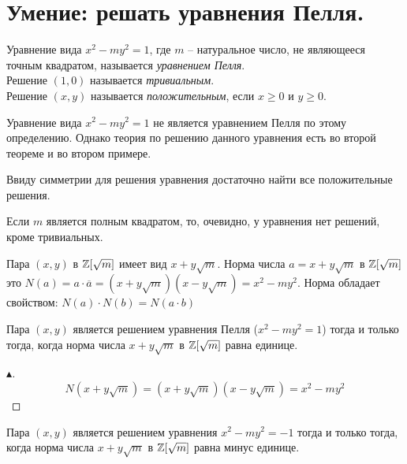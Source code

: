 \setcounter{section}{69}
\section{Умение: решать уравнения Пелля.}

\begin{definition}
    Уравнение вида $x^2 -my^2 = 1$, где $m$ -- натуральное число, не являющееся точным квадратом, называется \textit{уравнением Пелля}. \\
    Решение $(1, 0)$ называется \textit{тривиальным}. \\
    Решение $(x, y)$ называется \textit{положительным}, если $x \geq 0$ и $y \geq 0$.
\end{definition}

\begin{note}
    Уравнение вида $x^2 - my^2 = 1$ не является уравнением Пелля по этому определению. Однако теория по решению данного уравнения есть во второй теореме и во втором примере. 
\end{note}

\begin{note}
    Ввиду симметрии для решения уравнения достаточно найти все положительные решения.
\end{note}

\begin{note}
    Если $m$ является полным квадратом, то, очевидно, у уравнения нет решений, кроме тривиальных.
\end{note}

\begin{note}
    Пара $(x, y)$ в $\mathbb{Z}[\sqrt{m}]$ имеет вид $x + y\sqrt{m}$. Норма числа $a = x + y\sqrt{m}$ в $\mathbb{Z}[\sqrt{m}]$ это $N(a) = a \cdot \overline{a} = (x + y\sqrt{m})(x - y\sqrt{m}) = x^2 - my^2$. Норма обладает свойством: $N(a) \cdot N(b) = N(a\cdot b)$
\end{note}

\begin{proposition}
    Пара $(x, y)$ является решением уравнения Пелля ($x^2 - my^2 = 1$) тогда и только тогда, когда норма числа $x + y\sqrt{m}$ в $\mathbb{Z}[\sqrt{m}]$ равна единице.
    \begin{proof}[$\blacktriangle$]
        $$
            N(x + y\sqrt{m}) = (x + y\sqrt{m})(x - y\sqrt{m}) = x^2 - my^2
        $$
    \end{proof}
\end{proposition}

\begin{proposition}
    Пара $(x, y)$ является решением уравнения $x^2 - my^2 = -1$ тогда и только тогда, когда норма числа $x + y\sqrt{m}$ в $\mathbb{Z}[\sqrt{m}]$ равна минус единице.
\end{proposition}


